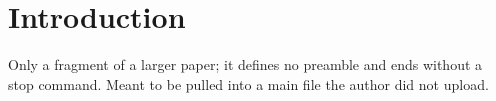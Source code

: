 \section{Introduction}
Only a fragment of a larger paper; it defines no preamble and ends without a
stop command. Meant to be pulled into a main file the author did not upload.
